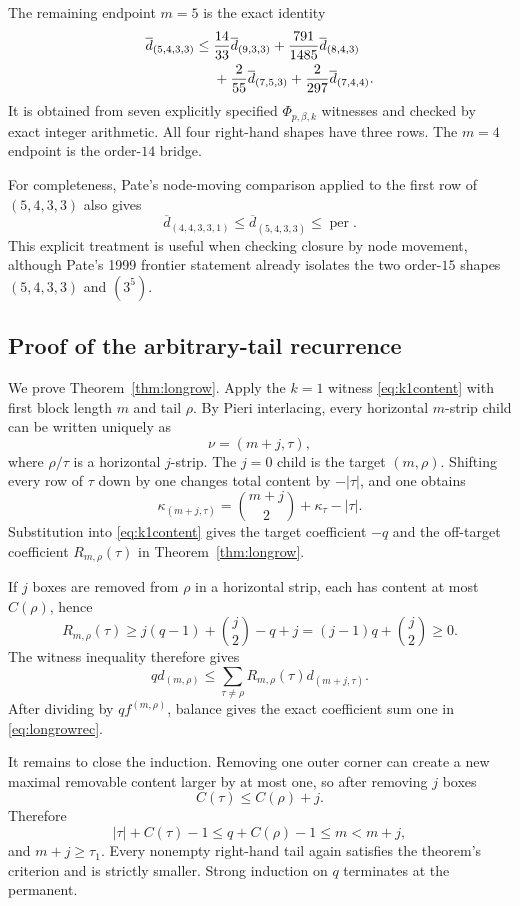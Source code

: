 \documentclass[11pt]{article}
\theoremstyle{definition}
\newcommand{\per}{\operatorname{per}}
\newcommand{\dbar}{\overline d}
\begin{document}
The remaining endpoint $m=5$ is the exact identity
\begin{align}\label{eq:5433bridge}
\dbar_{(5,4,3,3)}\le{}&\frac{14}{33}\dbar_{(9,3,3)}+
\frac{791}{1485}\dbar_{(8,4,3)}\\
&+\frac{2}{55}\dbar_{(7,5,3)}+
\frac{2}{297}\dbar_{(7,4,4)}.\notag
\end{align}
It is obtained from seven explicitly specified $\Phi_{p,\beta,k}$ witnesses and checked by exact integer arithmetic.  All four right-hand shapes have three rows.  The $m=4$ endpoint is the order-$14$ bridge.

For completeness, Pate's node-moving comparison applied to the first row of $(5,4,3,3)$ also gives
\begin{equation}\label{eq:44331}
 \dbar_{(4,4,3,3,1)}\le\dbar_{(5,4,3,3)}\le\per.
\end{equation}
This explicit treatment is useful when checking closure by node movement, although Pate's 1999 frontier statement already isolates the two order-$15$ shapes $(5,4,3,3)$ and $(3^5)$.

\subsection{Proof of the arbitrary-tail recurrence}
We prove Theorem~\ref{thm:longrow}.  Apply the $k=1$ witness \eqref{eq:k1content} with first block length $m$ and tail $\rho$.  By Pieri interlacing, every horizontal $m$-strip child can be written uniquely as
\[
 \nu=(m+j,\tau),
\]
where $\rho/\tau$ is a horizontal $j$-strip.  The $j=0$ child is the target $(m,\rho)$.  Shifting every row of $\tau$ down by one changes total content by $-|\tau|$, and one obtains
\[
 \kappa_{(m+j,\tau)}=\binom{m+j}{2}+\kappa_\tau-|\tau|.
\]
Substitution into \eqref{eq:k1content} gives the target coefficient $-q$ and the off-target coefficient $R_{m,\rho}(\tau)$ in Theorem~\ref{thm:longrow}.

If $j$ boxes are removed from $\rho$ in a horizontal strip, each has content at most $C(\rho)$, hence
\[
 R_{m,\rho}(\tau)\ge j(q-1)+\binom j2-q+j=(j-1)q+\binom j2\ge0.
\]
The witness inequality therefore gives
\[
 qd_{(m,\rho)}\le\sum_{\tau\ne\rho}R_{m,\rho}(\tau)d_{(m+j,\tau)}.
\]
After dividing by $qf^{(m,\rho)}$, balance gives the exact coefficient sum one in \eqref{eq:longrowrec}.

It remains to close the induction.  Removing one outer corner can create a new maximal removable content larger by at most one, so after removing $j$ boxes
\[
 C(\tau)\le C(\rho)+j.
\]
Therefore
\[
 |\tau|+C(\tau)-1\le q+C(\rho)-1\le m<m+j,
\]
and $m+j\ge\tau_1$.  Every nonempty right-hand tail again satisfies the theorem's criterion and is strictly smaller.  Strong induction on $q$ terminates at the permanent.
\end{document}

